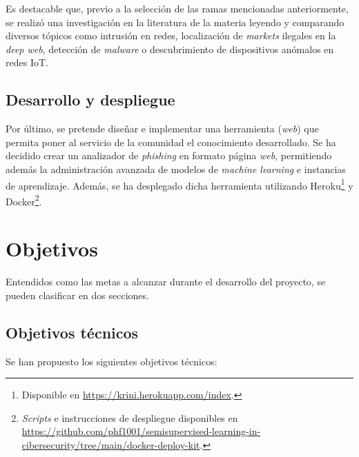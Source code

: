 Es destacable que, previo a la selección de las ramas mencionadas anteriormente, se realizó una investigación en la literatura de la materia leyendo y comparando diversos tópicos como intrusión en redes, localización de \textit{markets} ilegales en la \textit{deep web}, detección de \textit{malware} o descubrimiento de dispositivos anómalos en redes IoT.

\subsection{Desarrollo y despliegue}

Por último, se pretende diseñar e implementar una herramienta (\textit{web}) que permita poner al servicio de la comunidad el conocimiento desarrollado. Se ha decidido crear un analizador de \textit{phishing} en formato página \textit{web}, permitiendo además la administración avanzada de modelos de \textit{machine learning} e instancias de aprendizaje. Además, se ha desplegado dicha herramienta utilizando Heroku\footnote{Disponible en \url{https://krini.herokuapp.com/index}.} y Docker\footnote{\textit{Scripts} e instrucciones de despliegue disponibles en \url{https://github.com/phf1001/semisupervised-learning-in-cibersecurity/tree/main/docker-deploy-kit}.}.

\section{Objetivos}

Entendidos como las metas a alcanzar durante el desarrollo del proyecto, se pueden clasificar en dos secciones.

\subsection{Objetivos técnicos}
\label{Objetivos técnicos}

Se han propuesto los siguientes objetivos técnicos:

